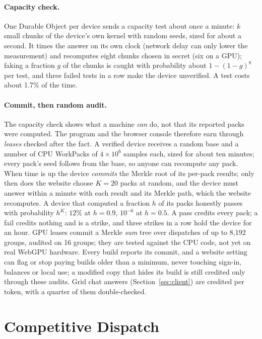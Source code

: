 \documentclass[11pt,a4paper]{article}
\theoremstyle{definition}
\theoremstyle{plain}
\begin{document}
\paragraph{Capacity check.} One Durable Object per device sends a capacity test about once a minute: $k$ small chunks of
the device's own kernel with random seeds, sized for about a second. It times the answer on its own clock (network delay can only lower the measurement) and recomputes eight chunks chosen in secret (six on a GPU); faking a fraction $g$ of the
chunks is caught with probability about $1-(1-g)^8$ per test, and three failed tests in a row make the device
unverified. A test costs about 1.7\% of the time.

\paragraph{Commit, then random audit.}\label{sec:commitaudit} The capacity check shows what a machine
\emph{can} do, not that its reported packs were computed. The program and the browser console therefore earn
through \emph{leases} checked after the fact. A verified device receives a random base and a number of CPU
WorkPacks of $4\times10^{6}$ samples each, sized for about ten minutes; every pack's seed follows from the base,
so anyone can recompute any pack. When time is up the device \emph{commits} the Merkle root of its per-pack
results; only then does the website choose $K=20$ packs at random, and the device must answer within a minute
with each result and its Merkle path, which the website recomputes. A device that computed a fraction $h$ of its
packs honestly passes with probability $h^{K}$: $12\%$ at $h=0.9$, $10^{-6}$ at $h=0.5$. A pass credits every
pack; a fail credits nothing and is a strike, and three strikes in a row hold the device for an hour. GPU leases commit a Merkle \emph{sum} tree over dispatches of up to 8{,}192 groups, audited on 16 groups;
they are tested against the CPU code, not yet on real WebGPU hardware. Every build reports its commit, and a website setting can flag or stop paying builds older than a minimum,
never touching sign-in, balances or local use; a modified copy that hides its build is still credited only
through these audits. Grid chat answers (Section~\ref{sec:client}) are credited per token, with a
quarter of them double-checked.

\section{Competitive Dispatch}\label{sec:race}
\end{document}
